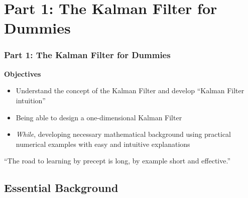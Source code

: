 \section{Part 1: The Kalman Filter for Dummies}
\begin{frame}
   \frametitle{Part 1: The Kalman Filter for Dummies}
		
		\textbf{Objectives}
				
		\begin{itemize}
			\item Understand the concept of the Kalman Filter and develop “Kalman Filter intuition”
			\item Being able to design a one-dimensional Kalman Filter
			\item \textit{While}, developing necessary mathematical background using practical numerical examples with easy and intuitive explanations
		\end{itemize}
		
		\vspace{10pt}
		
		\begin{exampleblock}{}
  {\small ``The road to learning by precept is long, by example short and effective.''}
  \vskip3mm
  \hspace*{}
\end{exampleblock}


\end{frame}

\subsection{Essential Background}

